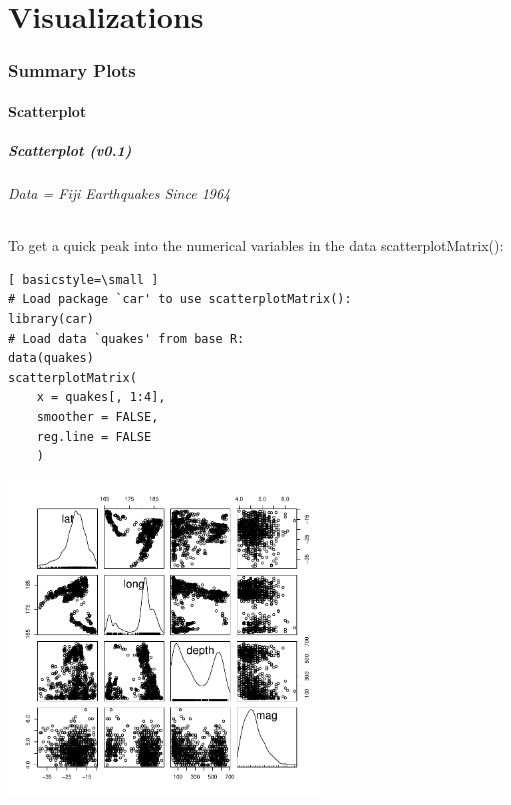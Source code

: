 \part{Visualizations}


\section[Summary Plots]{Summary Plots}

\subsection{Scatterplot}
\begin{frame}
\frametitle{Scatterplot (v0.1)}
  \framesubtitle{Data = Fiji Earthquakes Since 1964}

To get a quick peak into the numerical variables in the data \ttfamily scatterplotMatrix(): \normalfont
  		\begin{lstlisting}[ basicstyle=\small ]
# Load package `car' to use scatterplotMatrix():	
library(car)	
# Load data `quakes' from base R:
data(quakes)
scatterplotMatrix(
	x = quakes[, 1:4], 
	smoother = FALSE, 
	reg.line = FALSE
	)
		\end{lstlisting}

        \begin{center}
         \includegraphics[width=0.63\textwidth]{images/scatterPlot_v0.pdf}
        \end{center}
\end{frame}

